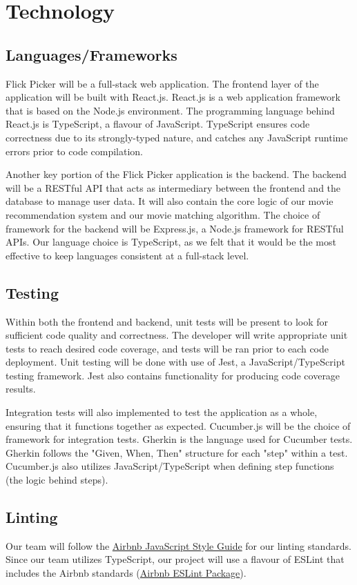 \documentclass{article}
\begin{document}
\section{Technology}
	

\subsection{Languages/Frameworks}

Flick Picker will be a full-stack web application. The frontend layer of the application will be built with React.js. React.js is a web application framework that is based on the Node.js environment. The programming language behind React.js is TypeScript, a flavour of JavaScript. TypeScript ensures code correctness due to its strongly-typed nature, and catches any JavaScript runtime errors prior to code compilation.

Another key portion of the Flick Picker application is the backend. The backend will be a RESTful API that acts as intermediary between the frontend and the database to manage user data. It will also contain the core logic of our movie recommendation system and our movie matching algorithm. The choice of framework for the backend will be Express.js, a Node.js framework for RESTful APIs. Our language choice is TypeScript, as we felt that it would be the most effective to keep languages consistent at a full-stack level.

\subsection{Testing}
Within both the frontend and backend, unit tests will be present to look for sufficient code quality and correctness. The developer will write appropriate unit tests to reach desired code coverage, and tests will be ran prior to each code deployment. Unit testing will be done with use of Jest, a JavaScript/TypeScript testing framework. Jest also contains functionality for producing code coverage results.

Integration tests will also implemented to test the application as a whole, ensuring that it functions together as expected. Cucumber.js will be the choice of framework for integration tests. Gherkin is the language used for Cucumber tests. Gherkin follows the "Given, When, Then" structure for each "step" within a test. Cucumber.js also utilizes JavaScript/TypeScript when defining step functions (the logic behind steps). 


\subsection{Linting}
Our team will follow the \href{https://github.com/airbnb/javascript}{Airbnb JavaScript Style Guide} for our linting standards. Since our team utilizes TypeScript, our project will use a flavour of ESLint that includes the Airbnb standards (\href{https://www.npmjs.com/package/eslint-config-airbnb-typescript}{Airbnb ESLint Package}).
\end{document}
